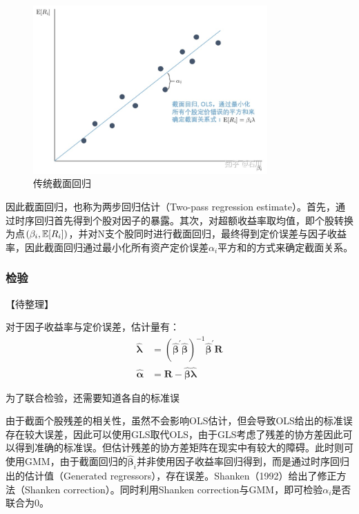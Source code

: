 \documentclass[11pt]{article}
\begin{document}
\begin{figure}[H]
    \centering
    \includegraphics[width=0.8\textwidth]{fig/cs_reg.jpg}
    \caption{传统截面回归}
    \label{fig：cs_reg}
\end{figure}

因此截面回归，也称为两步回归估计（Two-pass regression estimate）。首先，通过时序回归首先得到个股对因子的暴露。其次，对超额收益率取均值，即个股转换为点$(\beta_i,\mathbb{E}[R_i])$，并对N支个股同时进行截面回归，最终得到定价误差与因子收益率，因此截面回归通过最小化所有资产定价误差$\alpha_i$平方和的方式来确定截面关系。

\subsubsection{检验}

【待整理】

对于因子收益率与定价误差，估计量有：
\begin{align*}
    \hat{\bm{\lambda}} &= \left( \bm{\hat{\beta}^{'} \hat{\beta}}\right)^{-1} \bm{\hat{\beta}}^{'} \bm{R} \\
    \hat{\bm{\alpha}} &= \bm{R} - \bm{\hat{\beta} \hat{\lambda}}
\end{align*}

为了联合检验，还需要知道各自的标准误

由于截面个股残差的相关性，虽然不会影响OLS估计，但会导致OLS给出的标准误存在较大误差，因此可以使用GLS取代OLS，由于GLS考虑了残差的协方差因此可以得到准确的标准误。但估计残差的协方差矩阵在现实中有较大的障碍。此时则可使用GMM，由于截面回归的$\bm{\hat{\beta}}_i$并非使用因子收益率回归得到，而是通过时序回归出的估计值（Generated regressors），存在误差。Shanken（1992）给出了修正方法（Shanken correction）。同时利用Shanken correction与GMM，即可检验$\alpha_i$是否联合为0。
\end{document}
